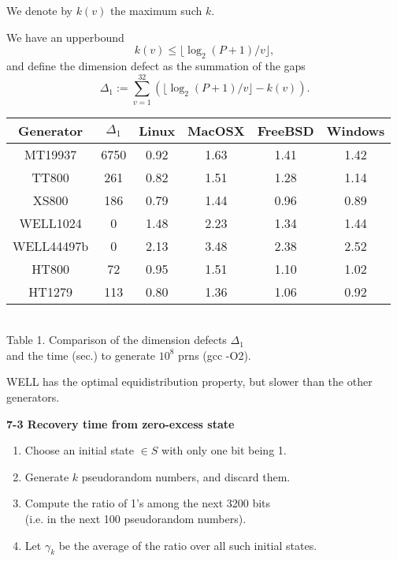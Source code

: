 \documentclass[a4j,12pt,landscape]{jarticle}
\begin{document}
{We denote by $k(v)$ the maximum such $k$. 

\vskip 5mm
We have an upperbound 
$$
k(v) \leq \lfloor \log_2 (P+1) / v \rfloor, 
$$
and define the dimension defect as the summation of the gaps 
$$
\Delta_1 := \sum_{v=1}^{32}(\lfloor \log_2 (P+1) / v \rfloor -k(v)).
$$

\newpage
\begin{center}
\begin{tabular}{|c||c|c|c|c|c|}
\hline
{\Huge Generator}& {\Huge $\Delta_1$} 
  & {\Huge Linux} & {\Huge MacOSX} & {\Huge FreeBSD} & {\Huge Windows} \\ \hline \hline
{\Huge MT19937} & {\Huge 6750}
  & {\Huge 0.92} & {\Huge 1.63} & {\Huge 1.41} & {\Huge 1.42} \\ \hline
{\Huge TT800}  & {\Huge 261} 
  & {\Huge 0.82} & {\Huge 1.51} & {\Huge 1.28} & {\Huge 1.14} \\ \hline
{\Huge XS800} & {\Huge 186}
  & {\Huge 0.79} & {\Huge 1.44} & {\Huge 0.96} & {\Huge 0.89} \\ \hline
{\Huge WELL1024} & {\Huge 0}
  & {\Huge 1.48} & {\Huge 2.23} & {\Huge 1.34} & {\Huge 1.44} \\ \hline
{\Huge WELL44497b} & {\Huge 0}
  & {\Huge 2.13} & {\Huge 3.48} & {\Huge 2.38} & {\Huge 2.52} \\ \hline
{\Huge HT800} & {\Huge 72} 
  & {\Huge 0.95} & {\Huge 1.51} & {\Huge 1.10} & {\Huge 1.02} \\\hline
{\Huge HT1279} & {\Huge 113}
  & {\Huge 0.80} & {\Huge 1.36} & {\Huge 1.06} & {\Huge 0.92} \\ \hline
\end{tabular}
\\
\vskip 5mm
Table 1. Comparison of the dimension defects $\Delta_1$ 
\\
and the time (sec.) to generate $10^8$ prns (gcc -O2). 
\end{center}

WELL has the optimal equidistribution property, 
but slower than the other generators. 

\newpage
\noindent
{\bf 7-3 Recovery time from zero-excess state}\\

\begin{enumerate}
\item Choose an initial state $\in S$ with only one bit being 1.
\item Generate $k$ pseudorandom numbers, and discard them.
\item Compute the ratio of 1's among the 
next 3200 bits 
\\
(i.e. in the next 100 pseudorandom numbers).
\item Let $\gamma_k$ be the average of the ratio over
all such initial states.
\end{enumerate}

}
\end{document}

